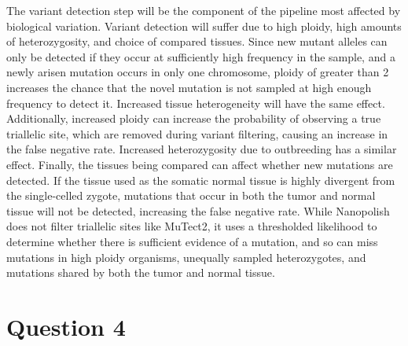 The variant detection step will be the component of the pipeline most affected by biological variation. Variant detection will suffer due to high ploidy, high amounts of heterozygosity, and choice of compared tissues. Since new mutant alleles can only be detected if they occur at sufficiently high frequency in the sample, and a newly arisen mutation occurs in only one chromosome, ploidy of greater than 2 increases the chance that the novel mutation is not sampled at high enough frequency to detect it. Increased tissue heterogeneity will have the same effect. Additionally, increased ploidy can increase the probability of observing a true triallelic site, which are removed during variant filtering, causing an increase in the false negative rate. Increased heterozygosity due to outbreeding has a similar effect. Finally, the tissues being compared can affect whether new mutations are detected. 
If the tissue used as the somatic normal tissue is highly divergent from the single-celled zygote, mutations that occur in both the tumor and normal tissue will not be detected, increasing the false negative rate.
While Nanopolish does not filter triallelic sites like MuTect2, it uses a thresholded likelihood to determine whether there is sufficient evidence of a mutation, and so can miss mutations in high ploidy organisms, unequally sampled heterozygotes, and mutations shared by both the tumor and normal tissue.

\section{Question 4}


